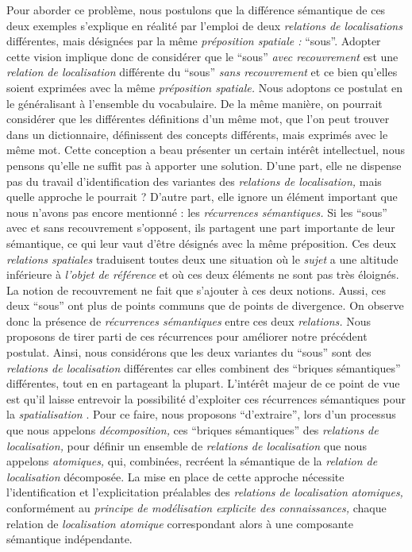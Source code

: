 Pour aborder ce problème, nous postulons que la différence sémantique
de ces deux exemples s'explique en réalité par l’emploi de deux
\emph{relations de localisations} différentes, mais désignées par la
même \emph{préposition spatiale :} \enquote{sous}. Adopter cette
vision implique donc de considérer que le \enquote{sous} \emph{avec
  recouvrement} est une \emph{relation de localisation} différente du
\enquote{sous} \emph{sans recouvrement} et ce bien qu'elles soient
exprimées avec la même \emph{préposition spatiale.} Nous adoptons ce
postulat en le généralisant à l'ensemble du vocabulaire. De la même
manière, on pourrait considérer que les différentes définitions d'un
même mot, que l'on peut trouver dans un dictionnaire, définissent des
concepts différents, mais exprimés avec le même mot. Cette conception
a beau présenter un certain intérêt intellectuel, nous pensons qu'elle
ne suffit pas à apporter une solution. D'une part, elle ne dispense
pas du travail d’identification des variantes des \emph{relations de
  localisation,} mais quelle approche le pourrait ? D'autre part, elle
ignore un élément important que nous n'avons pas encore mentionné :
les \emph{récurrences sémantiques.} Si les \enquote{sous} avec et sans
recouvrement s'opposent, ils partagent une part importante de leur
sémantique, ce qui leur vaut d'être désignés avec la même
préposition. Ces deux \emph{relations spatiales} traduisent toutes
deux une situation où le \emph{sujet} a une altitude inférieure à
\emph{l'objet de référence} et où ces deux éléments ne sont pas très
éloignés. La notion de recouvrement ne fait que s'ajouter à ces deux
notions. Aussi, ces deux \enquote{sous} ont plus de points communs que
de points de divergence. On observe donc la présence de
\emph{récurrences sémantiques} entre ces deux \emph{relations.} Nous
proposons de tirer parti de ces récurrences pour améliorer notre
précédent postulat. Ainsi, nous considérons que les deux variantes du
\enquote{sous} sont des \emph{relations de localisation} différentes
car elles combinent des \enquote{briques sémantiques} différentes,
tout en en partageant la plupart. L’intérêt majeur de ce point de vue
est qu'il laisse entrevoir la possibilité d'exploiter ces récurrences
sémantiques pour la \emph{spatialisation} \autocite{Bunel2019a}. Pour
ce faire, nous proposons \enquote{d'extraire}, lors d'un processus que
nous appelons \emph{décomposition,} ces \enquote{briques sémantiques}
des \emph{relations de localisation,} pour définir un ensemble de
\emph{relations de localisation} que nous appelons \emph{atomiques,}
qui, combinées, recréent la sémantique de la \emph{relation de
  localisation} décomposée. La mise en place de cette approche
nécessite l'identification et l'explicitation préalables des
\emph{relations de localisation atomiques,} conformément au
\emph{principe de modélisation explicite des connaissances,} chaque
relation de \emph{localisation atomique} correspondant alors à une
composante sémantique indépendante.

